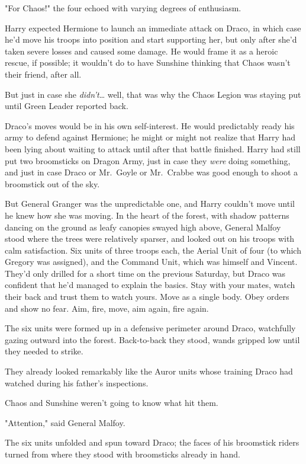 "For Chaos!" the four echoed with varying degrees of enthusiasm.

Harry expected Hermione to launch an immediate attack on Draco, in which case
he'd move his troops into position and start supporting her, but only after
she'd taken severe losses and caused some damage. He would frame it as a heroic
rescue, if possible; it wouldn't do to have Sunshine thinking that Chaos wasn't
their friend, after all.

But just in case she \emph{didn't}{\ldots} well, that was why the Chaos Legion
was staying put until Green Leader reported back.

Draco's moves would be in his own self-interest. He would predictably ready his
army to defend against Hermione; he might or might not realize that Harry had
been lying about waiting to attack until after that battle finished. Harry had
still put two broomsticks on Dragon Army, just in case they \emph{were} doing
something, and just in case Draco or Mr.~Goyle or Mr.~Crabbe was good enough to
shoot a broomstick out of the sky.

But General Granger was the unpredictable one, and Harry couldn't move until he
knew how she was moving.
\sbreak
In the heart of the forest, with shadow patterns dancing on the ground as leafy
canopies swayed high above, General Malfoy stood where the trees were
relatively sparser, and looked out on his troops with calm satisfaction. Six
units of three troops each, the Aerial Unit of four (to which Gregory was
assigned), and the Command Unit, which was himself and Vincent. They'd only
drilled for a short time on the previous Saturday, but Draco was confident that
he'd managed to explain the basics. Stay with your mates, watch their back and
trust them to watch yours. Move as a single body. Obey orders and show no fear.
Aim, fire, move, aim again, fire again.

The six units were formed up in a defensive perimeter around Draco, watchfully
gazing outward into the forest. Back-to-back they stood, wands gripped low
until they needed to strike.

They already looked remarkably like the Auror units whose training Draco had
watched during his father's inspections.

Chaos and Sunshine weren't going to know what hit them.

"Attention," said General Malfoy.

The six units unfolded and spun toward Draco; the faces of his broomstick
riders turned from where they stood with broomsticks already in hand.


